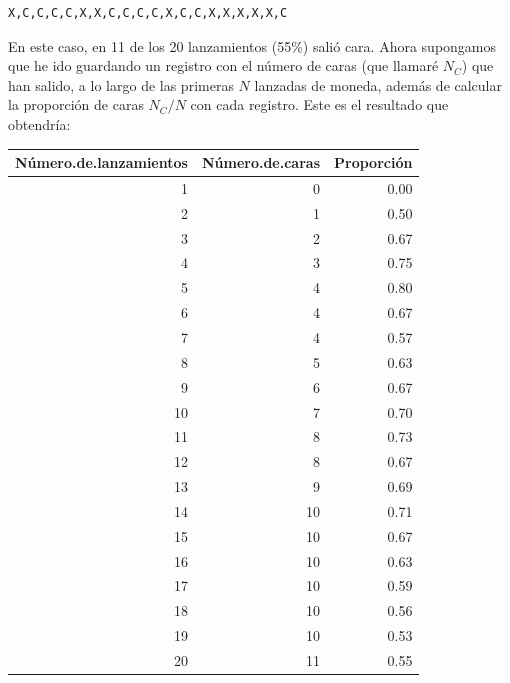 \documentclass[spanish,]{book}
\begin{document}
\begin{verbatim}
X,C,C,C,C,X,X,C,C,C,C,X,C,C,X,X,X,X,X,C
\end{verbatim}

En este caso, en 11 de los 20 lanzamientos (55\%) salió cara. Ahora
supongamos que he ido guardando un registro con el número de caras (que
llamaré \(N_C\)) que han salido, a lo largo de las primeras \(N\)
lanzadas de moneda, además de calcular la proporción de caras
\(N_C / N\) con cada registro. Este es el resultado que obtendría:

\begin{tabular}{r|r|r}
\hline
Número.de.lanzamientos & Número.de.caras & Proporción\\
\hline
1 & 0 & 0.00\\
\hline
2 & 1 & 0.50\\
\hline
3 & 2 & 0.67\\
\hline
4 & 3 & 0.75\\
\hline
5 & 4 & 0.80\\
\hline
6 & 4 & 0.67\\
\hline
7 & 4 & 0.57\\
\hline
8 & 5 & 0.63\\
\hline
9 & 6 & 0.67\\
\hline
10 & 7 & 0.70\\
\hline
11 & 8 & 0.73\\
\hline
12 & 8 & 0.67\\
\hline
13 & 9 & 0.69\\
\hline
14 & 10 & 0.71\\
\hline
15 & 10 & 0.67\\
\hline
16 & 10 & 0.63\\
\hline
17 & 10 & 0.59\\
\hline
18 & 10 & 0.56\\
\hline
19 & 10 & 0.53\\
\hline
20 & 11 & 0.55\\
\hline
\end{tabular}
\end{document}
